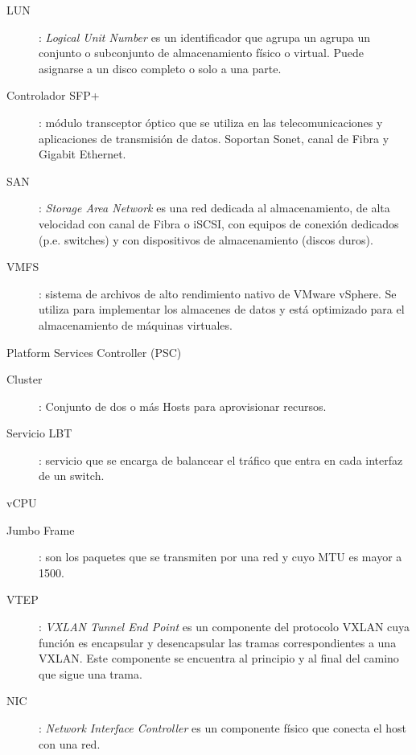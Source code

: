 \begin{description}
 \label{itm:almacendatos}
 \item [LUN]: \textit{Logical Unit Number} es un identificador que agrupa un agrupa un conjunto o subconjunto de almacenamiento físico o virtual. Puede asignarse a un disco completo o solo a una parte.
 \label{itm:lun}
 \item [Controlador SFP+]: módulo transceptor óptico que se utiliza en las telecomunicaciones y aplicaciones de transmisión de datos. Soportan Sonet, canal de Fibra y Gigabit Ethernet.
 \label{itm:sfp}
 \item [SAN]: \textit{Storage Area Network} es una red dedicada al almacenamiento, de alta velocidad con canal de Fibra o iSCSI, con equipos de conexión dedicados (p.e. switches) y con dispositivos de almacenamiento (discos duros). 
 \label{itm:san}
 \item [VMFS]: sistema de archivos de alto rendimiento nativo de VMware vSphere. Se utiliza para implementar los almacenes de datos y está optimizado para el almacenamiento de máquinas virtuales.
 \label{itm:vmfs}
 \item [Platform Services Controller (PSC)]
 \label{itm:psc}
 \item [Cluster]: Conjunto de dos o más Hosts para aprovisionar recursos.
 \label{itm:cluster}
 \item [Servicio LBT]: servicio que se encarga de balancear el tráfico que entra en cada interfaz de un switch.
 \item [vCPU]
 \label{itm:vcpu}
 \item [Jumbo Frame]: son los paquetes que se transmiten por una red y cuyo MTU es mayor a 1500.
 \label{itm:jumboframe}
 \item [VTEP]: \textit{VXLAN Tunnel End Point} es un componente del protocolo VXLAN cuya función es encapsular y desencapsular las tramas correspondientes a una VXLAN. Este componente se encuentra al principio y al final del camino que sigue una trama.
 \label{itm:vtep}
 \item [NIC]: \textit{Network Interface Controller} es un componente físico que conecta el host con una red.
 \label{itm:nic}
\end{description}
